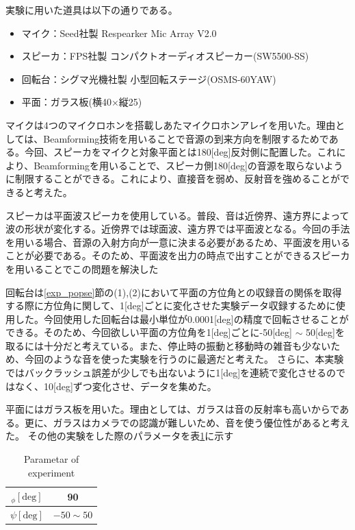 実験に用いた道具は以下の通りである。
\begin{itemize}
	\item マイク：Seed社製 Respearker Mic Array V2.0
	\item スピーカ：FPS社製 コンパクトオーディオスピーカー(SW5500-SS)
    \item 回転台：シグマ光機社製 小型回転ステージ(OSMS-60YAW)
    \item 平面：ガラス板(横40×縦25)
\end{itemize}
マイクは4つのマイクロホンを搭載しあたマイクロホンアレイを用いた。理由としては、Beamforming技術を用いることで音源の到来方向を制限するためである。今回、スピーカをマイクと対象平面とは180[deg]反対側に配置した。これにより、Beamformingを用いることで、スピーカ側180[deg]の音源を取らないように制限することができる。これにより、直接音を弱め、反射音を強めることができると考えた。

スピーカは平面波スピーカを使用している。普段、音は近傍界、遠方界によって波の形状が変化する。近傍界では球面波、遠方界では平面波となる。今回の手法を用いる場合、音源の入射方向が一意に決まる必要があるため、平面波を用いることが必要である。そのため、平面波を出力の時点で出すことができるスピーカを用いることでこの問題を解決した

回転台は\ref{exp_popse}節の(1),(2)において平面の方位角との収録音の関係を取得する際に方位角に関して、1[deg]ごとに変化させた実験データ収録するために使用した。今回使用した回転台は最小単位が0.0001[deg]の精度で回転させることができる。そのため、今回欲しい平面の方位角を1[deg]ごとに-50[deg] $\sim$ 50[deg]を取るには十分だと考えている。また、停止時の振動と移動時の雑音も少ないため、今回のような音を使った実験を行うのに最適だと考えた。
さらに、本実験ではバックラッシュ誤差が少しでも出ないように1[deg]を連続で変化させるのではなく、10[deg]ずつ変化させ、データを集めた。

平面にはガラス板を用いた。理由としては、ガラスは音の反射率も高いからである。更に、ガラスはカメラでの認識が難しいため、音を使う優位性があると考えた。
その他の実験をした際のパラメータを表\ref{tab:para}に示す

\begin{table}[t]
    \centering
    \caption{Parametar of experiment}
    \begin{tabular}{|c|c|}\hline
        $_\phi[\mathrm{deg}]$ & 90 \\ \hline
        $\psi[\mathrm{deg}]$ & $-50 \sim 50$ \\\hline
    \end{tabular}
    \label{tab:para}
\end{table}

